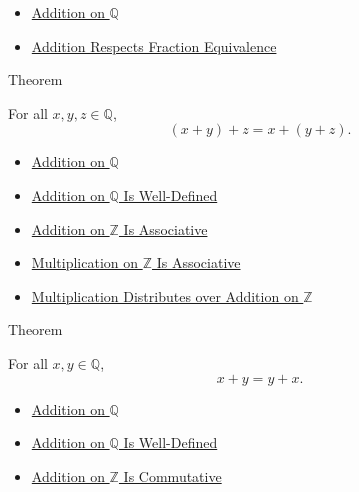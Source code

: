 \begin{dependencies}
\begin{itemize}
  \item \hyperref[def:addition-on-q-classes]{Addition on $\mathbb{Q}$}
  \item \hyperref[lem:addition-on-q-respects-equivalence]{Addition Respects Fraction Equivalence}
\end{itemize}
\end{dependencies}

\begin{theorembox}{Theorem}
\begin{theorem}
\label{thm:addition-on-q-associative}
For all $x,y,z\in\mathbb{Q}$,
\[
(x+y)+z=x+(y+z).
\]
\end{theorem}
\end{theorembox}

\begin{dependencies}
\begin{itemize}
  \item \hyperref[def:addition-on-q-classes]{Addition on $\mathbb{Q}$}
  \item \hyperref[thm:addition-on-q-well-defined]{Addition on $\mathbb{Q}$ Is Well-Defined}
  \item \hyperref[thm:addition-on-z-associative]{Addition on $\mathbb{Z}$ Is Associative}
  \item \hyperref[thm:multiplication-on-z-associative]{Multiplication on $\mathbb{Z}$ Is Associative}
  \item \hyperref[thm:multiplication-distributes-over-addition-on-z]{Multiplication Distributes over Addition on $\mathbb{Z}$}
\end{itemize}
\end{dependencies}

\begin{theorembox}{Theorem}
\begin{theorem}
\label{thm:addition-on-q-commutative}
For all $x,y\in\mathbb{Q}$,
\[
x+y=y+x.
\]
\end{theorem}
\end{theorembox}

\begin{dependencies}
\begin{itemize}
  \item \hyperref[def:addition-on-q-classes]{Addition on $\mathbb{Q}$}
  \item \hyperref[thm:addition-on-q-well-defined]{Addition on $\mathbb{Q}$ Is Well-Defined}
  \item \hyperref[thm:addition-on-z-commutative]{Addition on $\mathbb{Z}$ Is Commutative}
\end{itemize}
\end{dependencies}

